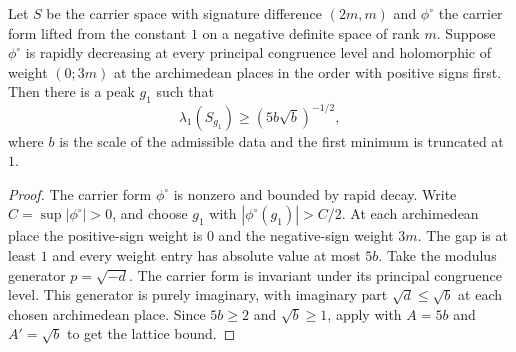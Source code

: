 \begin{lemma}
\label{lem:c-peak-carrier}
\emitthmsource
Let $S$ be the carrier space with signature difference $(2m,m)$ and $\phi^\circ$ the carrier form lifted from the constant $1$ on a negative definite space of rank $m$. Suppose $\phi^\circ$ is rapidly decreasing at every principal congruence level and holomorphic of weight $(0;3m)$ at the archimedean places in the order with positive signs first. Then there is a peak $g_1$ such that
\[
       \lambda_1(S_{g_1})\ge(5b\sqrt b)^{-1/2},
\]
where $b$ is the scale of the admissible data and the first minimum is truncated at $1$.
\end{lemma}

\begin{proof}
The carrier form $\phi^\circ$ is nonzero and bounded by rapid decay. Write $C=\sup|\phi^\circ|>0$, and choose $g_1$ with $|\phi^\circ(g_1)|>C/2$. At each archimedean place the positive-sign weight is $0$ and the negative-sign weight $3m$. The gap is at least $1$ and every weight entry has absolute value at most $5b$. Take the modulus generator $p=\sqrt{-d}$. The carrier form is invariant under its principal congruence level. This generator is purely imaginary, with imaginary part $\sqrt d\le\sqrt b$ at each chosen archimedean place. Since $5b\ge2$ and $\sqrt b\ge1$, apply  with $A=5b$ and $A'=\sqrt b$ to get the lattice bound.
\end{proof}

